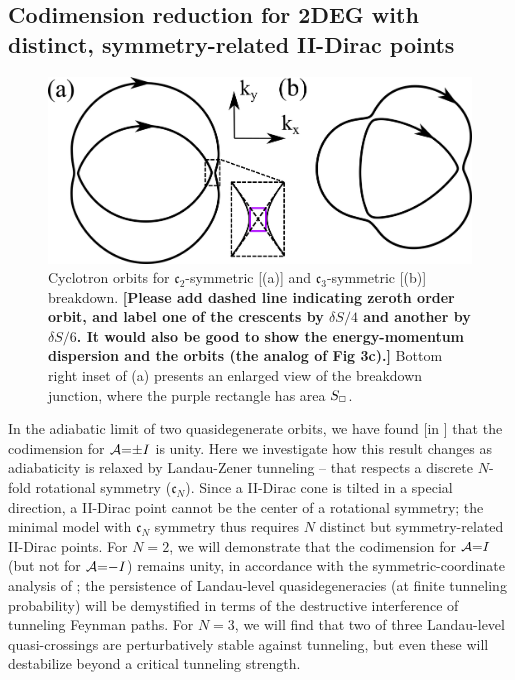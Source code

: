 \documentclass[aps, prb, showpacs, twocolumn, notitlepage, superscriptaddress]{revtex4-1}
\begin{document}
\subsection{Codimension reduction for 2DEG with distinct, symmetry-related II-Dirac points}

\begin{figure}
\includegraphics[width=1.0\columnwidth]{Cn-breakdown.png}
\caption{Cyclotron orbits for $\mathfrak{c}_2$-symmetric [(a)] and $\mathfrak{c}_3$-symmetric [(b)] breakdown. \textbf{[Please add dashed line indicating zeroth order orbit, and label one of the crescents by $\delta S/4$ and another by $\delta S/6$. It would also be good to show the energy-momentum dispersion and the orbits (the analog of Fig 3c).]} Bottom right inset of (a) presents an enlarged view of the breakdown junction, where the purple rectangle has area $S_{\scriptscriptstyle{\square}}$.\label{fig:Cn-breakdown}}
\end{figure}


In the adiabatic limit of two quasidegenerate orbits, we have found [in ] that the codimension for ${\cal A}{=}{\pm} I$ is unity. Here we investigate how this result changes as adiabaticity is relaxed by Landau-Zener tunneling -- that respects a discrete $N$-fold rotational symmetry ($\mathfrak{c}_N$). Since a II-Dirac cone is tilted in a special direction, a II-Dirac point cannot be the center of a rotational symmetry; the minimal model with $\mathfrak{c}_N$ symmetry thus requires $N$ distinct but symmetry-related II-Dirac points. For $N{=}2$, we will demonstrate that the codimension for ${\cal A}{=}I$ (but not for ${\cal A}{=}{-}I$) remains unity, in accordance with the symmetric-coordinate analysis of ; the persistence of  Landau-level quasidegeneracies  (at finite tunneling probability) will be demystified in terms of the destructive interference of tunneling Feynman paths. For $N{=}3$, we will find that two of three Landau-level quasi-crossings are perturbatively stable against tunneling, but even these will destabilize beyond a critical tunneling strength. 
\end{document}
